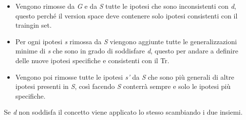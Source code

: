 \begin{itemize}
\tightlist
\item
  Vengono rimosse da \emph{G} e da \emph{S} tutte le ipotesi che sono
  inconsistenti con \emph{d}, questo perché il version space deve
  contenere solo ipotesi consistenti con il traingin set.
\item
  Per ogni ipotesi \emph{s} rimossa da \emph{S} viengono aggiunte tutte
  le generalizzazioni minime di \emph{s} che sono in grado di soddisfare
  \emph{d}, questo per andare a definire delle nuove ipotesi specifiche
  e consistenti con il Tr.
\item
  Vengono poi rimosse tutte le ipotesi \emph{s'} da \emph{S} che sono
  più generali di altre ipotesi presenti in \emph{S}, così facendo
  \emph{S} conterrà sempre e solo le ipotesi più specifiche.
\end{itemize}

Se \emph{d} non soddisfa il concetto viene applicato lo stesso
scambiando i due insiemi.
